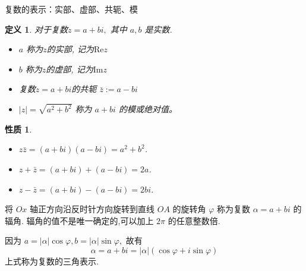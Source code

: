 \documentclass[13pt,fontset=mac]{ctexbeamer}
\newtheorem*{defi}{定义}
\newtheorem*{prop}{性质}
\begin{document}
\begin{frame}{复数的表示：实部、虚部、共轭、模}
	
	\begin{defi}
		对于复数$z=a+b i,$ 其中 $a, b$ 是实数.
		
		\begin{itemize}
			\item $a$ 称为$z$的\alert{实部}, 记为$\text{Re} z$
			
			\item $b$ 称为$z$的\alert{虚部}, 记为$\text{Im}  z$
			
			\item 复数$z=a+b i$的\alert{共轭} $\bar{z}:=a-bi$ 
			\item  $|z|=\sqrt{a^{2}+b^{2}}$ 称为 $a+b i$ 的\alert{模}或绝对值。
		\end{itemize}
	\end{defi}
	\begin{prop}
		\begin{itemize}
			\item $z  \bar{z}=(a+b i)(a-b i)=a^{2}+b^{2}$.
			\item $z+\bar{z}=(a+b i)+(a-b i)=2 a$.
			\item $z-\bar{z}=(a+b i)-(a-b i)=2 b i$.
		\end{itemize}
	\end{prop}
\end{frame}



\begin{frame}
	将 $Ox$ 轴正方向沿反时针方向旋转到直线 $OA$ 的旋转角 $\varphi$ 称为复数 $\alpha=a+b {i}$ 的\alert{辐角}. 辐角的值不是唯一确定的,可以加上 $2 \pi$ 的任意整数倍. 
	
	因为 $a=|\alpha| \cos \varphi, b=|\alpha| \sin \varphi,$ 故有
	\[
	\alpha=a+b {i}=|\alpha|(\cos \varphi+{i} \sin \varphi)
	\]
	上式称为复数的三角表示. 
	\begin{center}
	\end{center}
\end{frame}
\end{document}
